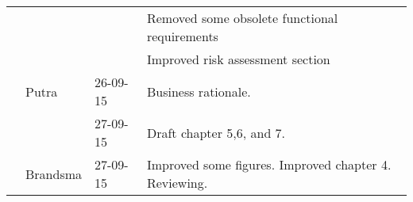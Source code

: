 \begin{longtable}{L{} L{} L{} L{}}
	                 &                       &               & Removed some obsolete functional requirements                                                                                                                                                                              \\
	                 &                       &               & Improved risk assessment section                                                                                                                                                                                           \\
	                 & Putra                 & 26-09-15      & Business rationale.                                                                                                                                                                                                        \\
	                 &                       & 27-09-15      & Draft chapter 5,6, and 7.                                                                                                                                                                                                  \\
	                 & Brandsma              & 27-09-15      & Improved some figures. Improved chapter 4. Reviewing.                                                                                                                                                                      \\
	\midrule
			

\end{longtable}
